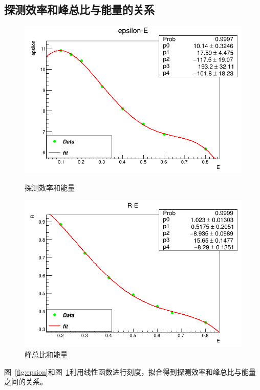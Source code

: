 \documentclass[10pt]{ctexart}
\begin{document}
\subsection{探测效率和峰总比与能量的关系}
\begin{figure}[htbp]
    \centering
    \begin{minipage}{0.45\textwidth}
        \centering
        \includegraphics[width=\textwidth]{data/epsilon.png}
        \caption{探测效率和能量}
        \label{fig:epsilon}
    \end{minipage}
    \qquad
    \begin{minipage}{0.45\textwidth}
        \centering
        \includegraphics[width=\textwidth]{data/R.png}
        \caption{峰总比和能量}
        \label{fig:R}
    \end{minipage}
\end{figure}
图~\ref{fig:epsion}和图~\ref{fig:R}利用线性函数进行刻度，拟合得到探测效率和峰总比与能量之间的关系。
\[\]
\[\]
\end{document}
